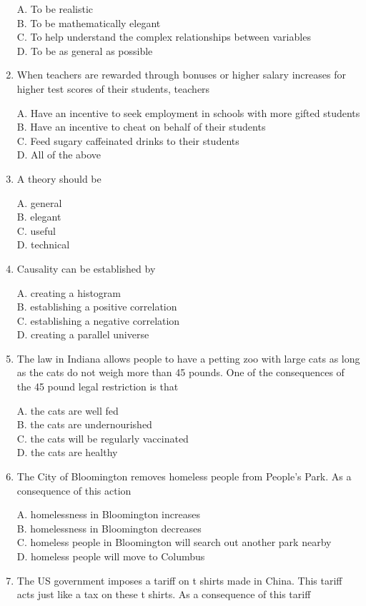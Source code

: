 \documentclass[
]{book}
\begin{document}
\begin{enumerate}
  A. To be realistic\\
  B. To be mathematically elegant\\
  C. To help understand the complex relationships between variables\\
  D. To be as general as possible
\item
  When teachers are rewarded through bonuses or higher salary increases for higher test scores of their students, teachers

  A. Have an incentive to seek employment in schools with more gifted students\\
  B. Have an incentive to cheat on behalf of their students\\
  C. Feed sugary caffeinated drinks to their students\\
  D. All of the above
\item
  A theory should be

  A. general\\
  B. elegant\\
  C. useful\\
  D. technical
\item
  Causality can be established by

  A. creating a histogram\\
  B. establishing a positive correlation\\
  C. establishing a negative correlation\\
  D. creating a parallel universe
\item
  The law in Indiana allows people to have a petting zoo with large cats as long as the cats do not weigh more than 45 pounds. One of the consequences of the 45 pound legal restriction is that

  A. the cats are well fed\\
  B. the cats are undernourished\\
  C. the cats will be regularly vaccinated\\
  D. the cats are healthy
\item
  The City of Bloomington removes homeless people from People's Park. As a consequence of this action

  A. homelessness in Bloomington increases\\
  B. homelessness in Bloomington decreases\\
  C. homeless people in Bloomington will search out another park nearby\\
  D. homeless people will move to Columbus
\item
  The US government imposes a tariff on t shirts made in China. This tariff acts just like a tax on these t shirts. As a consequence of this tariff


\end{enumerate}
\end{document}
